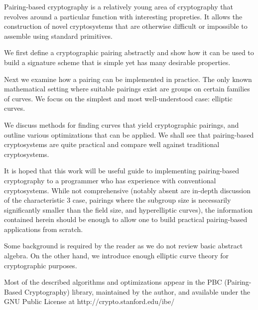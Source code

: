 \beforepreface
{}
Pairing-based cryptography is a relatively young area of cryptography that
revolves around a particular function with interesting propreties.
It allows the construction of novel cryptosystems that are otherwise
difficult or impossible to assemble using standard primitives.

We first define a cryptographic pairing abstractly and show how it
can be used to build a signature scheme that is simple yet has many
desirable properties.

Next we examine how a pairing can be implemented in practice. The only known
mathematical setting where suitable pairings exist are groups on certain
families of curves. We focus on the simplest and most well-understood case:
elliptic curves.

We discuss methods for finding curves that yield cryptographic pairings,
and outline various optimizations that can be applied. We shall see that
pairing-based cryptosystems are quite practical and compare well against
traditional cryptosystems.

It is hoped that this work will be useful guide to implementing pairing-based
cryptography to a programmer who has experience with conventional
cryptosystems. While not comprehensive (notably absent are in-depth
discussion of the characteristic 3 case, pairings where
the subgroup size is necessarily significantly smaller than the field size,
and hyperelliptic curves),
the information contained herein should be enough to allow one to build
practical pairing-based applications from scratch.

Some background is required by the reader as
we do not review basic abstract algebra.
On the other hand, we introduce enough elliptic curve theory for
cryptographic purposes.

Most of the described algorithms and optimizations
appear in the PBC (Pairing-Based Cryptography) library, maintained by the
author, and available under the GNU Public License at 
http://crypto.stanford.edu/ibe/
